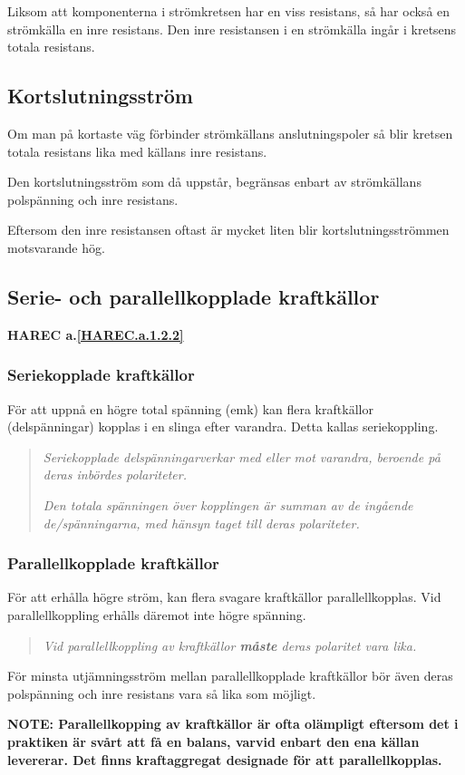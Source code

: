 Liksom att komponenterna i strömkretsen har en viss resistans, så har också en
strömkälla en inre resistans. Den inre resistansen i en strömkälla ingår i
kretsens totala resistans.

\subsection{Kortslutningsström}

Om man på kortaste väg förbinder strömkällans anslutningspoler så blir kretsen
totala resistans lika med källans inre resistans.

Den kortslutningsström som då uppstår, begränsas enbart av strömkällans
polspänning och inre resistans.

Eftersom den inre resistansen oftast är mycket liten blir kortslutningsströmmen
motsvarande hög.

\subsection{Serie- och parallellkopplade kraftkällor}
\textbf{HAREC a.\ref{HAREC.a.1.2.2}\label{myHAREC.a.1.2.2}}

\subsubsection{Seriekopplade kraftkällor}

För att uppnå en högre total spänning (emk) kan flera kraftkällor
(delspänningar) kopplas i en slinga efter varandra. Detta kallas seriekoppling.

\begin{quote}
\emph{Seriekopplade delspänningarverkar med eller mot varandra, beroende på
deras inbördes polariteter.}

\emph{Den totala spänningen över kopplingen är summan av de ingående
de/spänningarna, med hänsyn taget till deras polariteter.}
\end{quote}

\subsubsection{Parallellkopplade kraftkällor}

För att erhålla högre ström, kan flera svagare kraftkällor parallellkopplas.
Vid parallellkoppling erhålls däremot inte högre spänning.

\begin{quote}
\emph{Vid parallellkoppling av kraftkällor \textbf{måste} deras polaritet vara lika.}
\end{quote}

För minsta utjämningsström mellan parallellkopplade kraftkällor bör även deras
polspänning och inre resistans vara så lika som möjligt.

\textbf{NOTE: Parallellkopping av kraftkällor är ofta olämpligt eftersom det
i praktiken är svårt att få en balans, varvid enbart den ena källan levererar.
Det finns kraftaggregat designade för att parallellkopplas.}